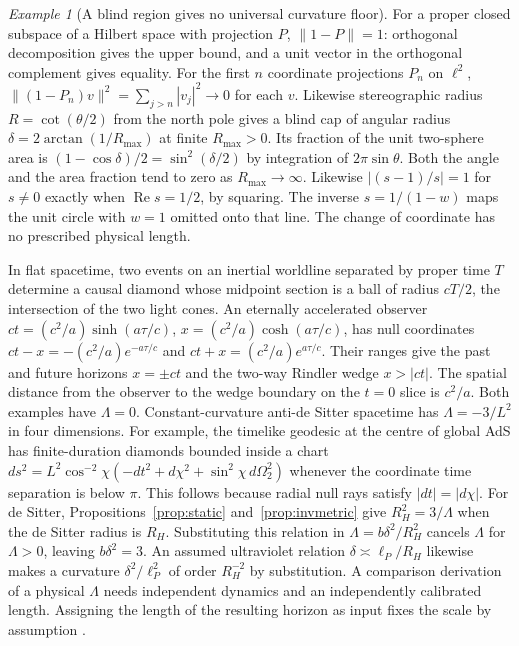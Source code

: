 \documentclass[aps,pra,onecolumn,superscriptaddress,nofootinbib,10pt]{revtex4-2}
\theoremstyle{definition}
\theoremstyle{remark}
\newtheorem{example}[theorem]{Example}
\begin{document}
\begin{example}[A blind region gives no universal curvature floor]\label{ob:curvature}
For a proper closed subspace of a Hilbert space with projection \(P\),
\(\lVert1-P\rVert=1\): orthogonal decomposition gives the upper bound,
and a unit vector in the orthogonal complement gives equality.
For the first \(n\) coordinate projections \(P_n\) on \(\ell^2\),
\(\|(1-P_n)v\|^2=\sum_{j>n}|v_j|^2\to0\) for each \(v\).
Likewise stereographic radius \(R=\cot(\theta/2)\) from the
north pole gives a blind cap of angular radius
\(\delta=2\arctan(1/R_{\max})\) at finite \(R_{\max}>0\).
Its fraction of the unit two-sphere area is
\((1-\cos\delta)/2=\sin^2(\delta/2)\) by integration of
\(2\pi\sin\theta\). Both the angle and the area fraction tend to
zero as \(R_{\max}\to\infty\). Likewise
\(\lvert(s-1)/s\rvert=1\) for \(s\ne0\) exactly when
\(\operatorname{Re}s=1/2\), by squaring. The inverse \(s=1/(1-w)\)
maps the unit circle with \(w=1\) omitted onto that line.
The change of coordinate has no prescribed physical length.

In flat spacetime, two events on an inertial worldline separated by
proper time \(T\) determine a causal diamond whose midpoint section
is a ball of radius \(cT/2\), the intersection of the two light cones.
An eternally accelerated observer \(ct=(c^2/a)\sinh(a\tau/c)\),
\(x=(c^2/a)\cosh(a\tau/c)\), has null coordinates
\(ct-x=-(c^2/a)e^{-a\tau/c}\) and
\(ct+x=(c^2/a)e^{a\tau/c}\). Their ranges give the past and future
horizons \(x=\pm ct\) and the two-way Rindler wedge \(x>|ct|\).
The spatial distance from the observer to the wedge boundary
on the \(t=0\) slice is \(c^2/a\). Both examples have \(\Lambda=0\). Constant-curvature
anti-de Sitter spacetime has \(\Lambda=-3/L^2\) in four dimensions.
For example, the timelike geodesic at the centre of global AdS
has finite-duration diamonds bounded inside a chart
\(ds^2=L^2\cos^{-2}\chi(-dt^2+d\chi^2+\sin^2\chi\,d\Omega_2^2)\)
whenever the coordinate time separation is below \(\pi\).
This follows because radial null rays satisfy \(|dt|=|d\chi|\).
For de Sitter, Propositions~\ref{prop:static} and~\ref{prop:invmetric}
give \(R_H^2=3/\Lambda\) when the de Sitter
radius is \(R_H\). Substituting this relation in
\(\Lambda=b\delta^2/R_H^2\) cancels \(\Lambda\) for \(\Lambda>0\),
leaving \(b\delta^2=3\). An assumed ultraviolet relation
\(\delta\asymp\ell_P/R_H\) likewise makes a curvature
\(\delta^2/\ell_P^2\) of order \(R_H^{-2}\) by substitution.
A comparison derivation of a physical \(\Lambda\) needs
independent dynamics and an independently calibrated length. Assigning the length of the resulting horizon
as input fixes the scale by assumption
\cite{GibbonsHawking,obr:weinberg}.
\end{example}
\end{document}
